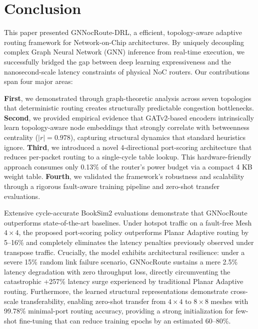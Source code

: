 \section{Conclusion}
\label{sec:conclusion}

This paper presented GNNocRoute-DRL, a efficient, topology-aware adaptive routing framework for Network-on-Chip architectures. By uniquely decoupling complex Graph Neural Network (GNN) inference from real-time execution, we successfully bridged the gap between deep learning expressiveness and the nanosecond-scale latency constraints of physical NoC routers. Our contributions span four major areas:

\textbf{First}, we demonstrated through graph-theoretic analysis across seven topologies that deterministic routing creates structurally predictable congestion bottlenecks. \textbf{Second}, we provided empirical evidence that GATv2-based encoders intrinsically learn topology-aware node embeddings that strongly correlate with betweenness centrality ($|r| = 0.978$), capturing structural dynamics that standard heuristics ignore. \textbf{Third}, we introduced a novel 4-directional port-scoring architecture that reduces per-packet routing to a single-cycle table lookup. This hardware-friendly approach consumes only 0.13\% of the router's power budget via a compact 4 KB weight table. \textbf{Fourth}, we validated the framework's robustness and scalability through a rigorous fault-aware training pipeline and zero-shot transfer evaluations.

Extensive cycle-accurate BookSim2 evaluations demonstrate that GNNocRoute outperforms state-of-the-art baselines. Under hotspot traffic on a fault-free Mesh $4\times4$, the proposed port-scoring policy outperforms Planar Adaptive routing by 5--16\% and completely eliminates the latency penalties previously observed under transpose traffic. Crucially, the model exhibits architectural resilience: under a severe 15\% random link failure scenario, GNNocRoute sustains a mere 2.5\% latency degradation with zero throughput loss, directly circumventing the catastrophic +257\% latency surge experienced by traditional Planar Adaptive routing. Furthermore, the learned structural representations demonstrate cross-scale transferability, enabling zero-shot transfer from $4\times4$ to $8\times8$ meshes with 99.78\% minimal-port routing accuracy, providing a strong initialization for few-shot fine-tuning that can reduce training epochs by an estimated 60--80\%.

